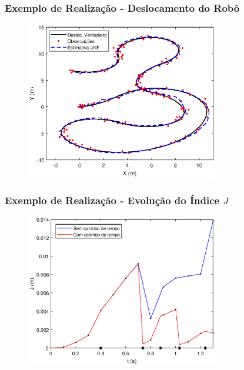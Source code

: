 \documentclass{beamer}
\renewcommand{\(}{\left(}
\renewcommand{\)}{\right)}
\renewcommand{\[}{\left[}
\renewcommand{\]}{\right]}
\begin{document}
\begin{frame}
\frametitle{Exemplo de Realização - Deslocamento do Robô}

\begin{figure}
	\centering
	\includegraphics[width=0.75\textwidth]{images/exemplo_03_30db_desloc.eps}
\end{figure}

\end{frame}


\begin{frame}
\frametitle{Exemplo de Realização - Evolução do Índice $J$}

\begin{figure}
	\centering
	\includegraphics[width=0.75\textwidth]{images/J_umarealizacao.eps}
\end{figure}

\end{frame}
\end{document}
